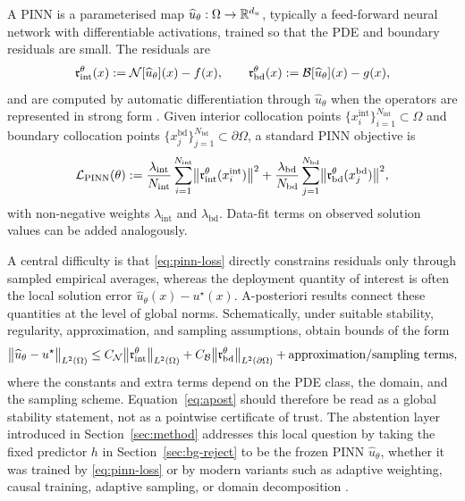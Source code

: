 A PINN is a parameterised map
$\widehat{u}_\theta:\Omega\to\mathbb{R}^{d_u}$, typically a feed-forward neural
network with differentiable activations, trained so that the PDE and
boundary residuals are small. The residuals are
\begin{equation}
  \mathfrak{r}_{\mathrm{int}}^\theta(x)
  :=
  \mathcal{N}[\widehat{u}_\theta](x)-f(x),
  \qquad
  \mathfrak{r}_{\mathrm{bd}}^\theta(x)
  :=
  \mathcal{B}[\widehat{u}_\theta](x)-g(x),
  \label{eq:residuals}
\end{equation}
and are computed by automatic differentiation through
$\widehat{u}_\theta$ when the operators are represented in strong form
\citep{raissi2019physics,karniadakis2021physics,lu2021deepxde}. Given
interior collocation points
$\{x_i^{\mathrm{int}}\}_{i=1}^{N_{\mathrm{int}}}\subset\Omega$ and boundary
collocation points
$\{x_j^{\mathrm{bd}}\}_{j=1}^{N_{\mathrm{bd}}}\subset\partial\Omega$, a
standard PINN objective is
\begin{equation}
  \mathcal{L}_{\mathrm{PINN}}(\theta)
  :=
  \frac{\lambda_{\mathrm{int}}}{N_{\mathrm{int}}}
  \sum_{i=1}^{N_{\mathrm{int}}}
    \bigl\|\mathfrak{r}_{\mathrm{int}}^\theta(x_i^{\mathrm{int}})\bigr\|^2
  +
  \frac{\lambda_{\mathrm{bd}}}{N_{\mathrm{bd}}}
  \sum_{j=1}^{N_{\mathrm{bd}}}
    \bigl\|\mathfrak{r}_{\mathrm{bd}}^\theta(x_j^{\mathrm{bd}})\bigr\|^2,
  \label{eq:pinn-loss}
\end{equation}
with non-negative weights $\lambda_{\mathrm{int}}$ and
$\lambda_{\mathrm{bd}}$. Data-fit terms on observed solution values can be
added analogously.

A central difficulty is that \eqref{eq:pinn-loss} directly constrains
residuals only through sampled empirical averages, whereas the deployment
quantity of interest is often the local solution error
$\widehat{u}_\theta(x)-u^\star(x)$. A-posteriori results connect these
quantities at the level of global norms. Schematically, under suitable
stability, regularity, approximation, and sampling assumptions,
\citet{mishra2022estimates} obtain bounds of the form
\begin{equation}
  \bigl\|\widehat{u}_\theta-u^\star\bigr\|_{L^2(\Omega)}
  \leq
  C_{\mathcal{N}}
  \bigl\|\mathfrak{r}_{\mathrm{int}}^\theta\bigr\|_{L^2(\Omega)}
  +
  C_\mathcal{B}
  \bigl\|\mathfrak{r}_{\mathrm{bd}}^\theta\bigr\|_{L^2(\partial\Omega)}
  +
  \mathrm{approximation/sampling\ terms},
  \label{eq:apost}
\end{equation}
where the constants and extra terms depend on the PDE class, the domain,
and the sampling scheme. Equation~\eqref{eq:apost} should therefore be read
as a global stability statement, not as a pointwise certificate of trust.
The abstention layer introduced in Section~\ref{sec:method} addresses this
local question by taking the fixed predictor $h$ in
Section~\ref{sec:bg-reject} to be the frozen PINN
$\widehat{u}_\theta$, whether it was trained by \eqref{eq:pinn-loss} or by
modern variants such as adaptive weighting, causal training, adaptive
sampling, or domain decomposition \citep{wang2021understanding,
mcclenny2023self,wang2022respecting,wu2023comprehensive,daw2023mitigating,
jagtap2020extended,jagtap2020conservative,moseley2023finite}.
